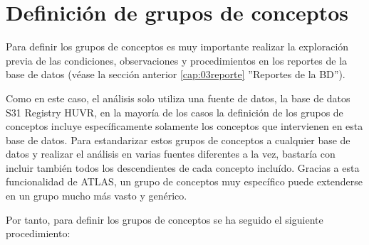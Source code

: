 \chapter{Definición de grupos de conceptos} \label{cap:04concepto}

Para definir los grupos de conceptos es muy importante realizar la  exploración previa de las condiciones, observaciones y procedimientos  en los reportes de la base de datos (véase la sección anterior \ref{cap:03reporte} ''Reportes de la BD'').

Como en este caso, el análisis solo utiliza una fuente de datos, la base de datos S31 Registry HUVR, en la mayoría de los casos la definición de los grupos de conceptos incluye específicamente solamente los conceptos que intervienen en esta base de datos. Para estandarizar estos grupos de conceptos a cualquier base de datos y realizar el análisis en varias fuentes diferentes a la vez, bastaría con incluir también todos los descendientes de cada concepto incluído. Gracias a esta funcionalidad de ATLAS, un grupo de conceptos muy específico puede extenderse en un grupo mucho más vasto y genérico.

Por tanto, para definir los grupos de conceptos se ha seguido el siguiente procedimiento:

